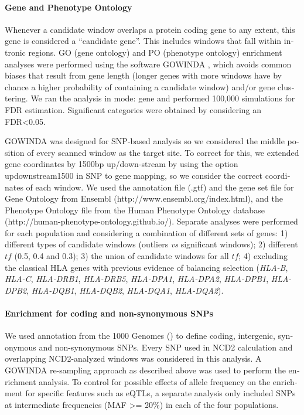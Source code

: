 \begin{refsection}
\begin{otherlanguage}{english}
\paragraph{Gene and Phenotype Ontology}
Whenever a candidate window overlaps a protein coding gene to any extent, this gene is considered a “candidate gene”. This includes windows that fall within intronic regions. GO (gene ontology) and PO (phenotype ontology) enrichment analyses were performed using the software GOWINDA \parencite{Kofler2012}, which avoids common biases that result from gene length (longer genes with more windows have by chance a higher probability of containing a candidate window) and/or gene clustering. We ran the analysis in mode: gene and performed 100,000 simulations for FDR estimation. Significant categories were obtained by considering an FDR<0.05. 
%

GOWINDA was designed for SNP-based analysis so we considered the middle position of every scanned window as the target site. To correct for this, we extended gene coordinates by 1500bp up/down-stream by using the option updownstream1500 in SNP to gene mapping, so we consider the correct coordinates of each window. We used the annotation file (.gtf) and the gene set file for Gene Ontology from Ensembl (http://www.ensembl.org/index.html), and the Phenotype Ontology file from the Human Phenotype Ontology database (http://human-phenotype-ontology.github.io/). 
%
Separate analyses were performed for each population and considering a combination of different sets of genes: 1) different types of candidate windows (outliers \emph{vs} significant windows); 2) different $tf$ (0.5, 0.4 and 0.3); 3) the union of candidate windows for all $tf$; 4) excluding the classical HLA genes with previous evidence of balancing selection (\emph{HLA-B}, \emph{HLA-C}, \emph{HLA-DRB1}, \emph{HLA-DRB5}, \emph{HLA-DPA1}, \emph{HLA-DPA2}, \emph{HLA-DPB1}, \emph{HLA-DPB2}, \emph{HLA-DQB1}, \emph{HLA-DQB2}, \emph{HLA-DQA1}, \emph{HLA-DQA2}).
%
%
\paragraph{Enrichment for coding and non-synonymous SNPs} 
We used annotation from the 1000 Genomes (\cite{Abecasis2012}) to define coding, intergenic, synonymous and non-synonymous SNPs. Every SNP used in NCD2 calculation and overlapping NCD2-analyzed windows was considered in this analysis. A GOWINDA re-sampling approach as described above was used to perform the enrichment analysis. To control for possible effects of allele frequency on the enrichment for specific features such as eQTLs, a separate analysis only included SNPs at intermediate frequencies (MAF >= 20\%) in each of the four populations.
%

\end{otherlanguage}
\end{refsection}
